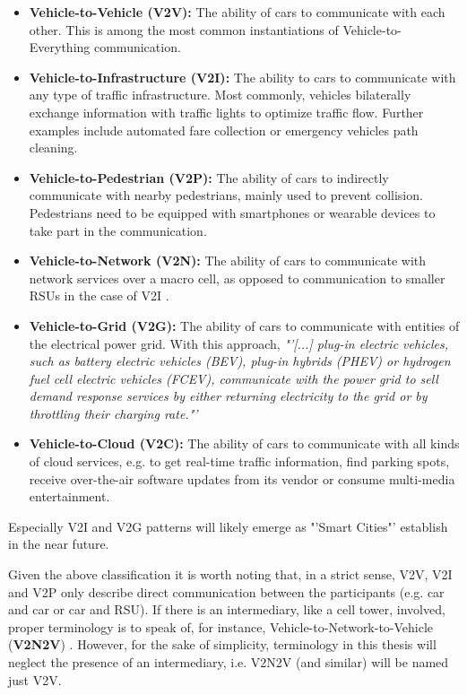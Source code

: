 \begin{itemize}
	\item \textbf{Vehicle-to-Vehicle (V2V):} The ability of cars to communicate with each other. This is among the most common instantiations of Vehicle-to-Everything communication. 
	\item  \textbf{Vehicle-to-Infrastructure (V2I):} The ability to cars to communicate with any type of traffic infrastructure. Most commonly, vehicles bilaterally exchange information with traffic lights to optimize traffic flow. Further examples include automated fare collection or emergency vehicles path cleaning.
	\item \textbf{Vehicle-to-Pedestrian (V2P):} The ability of cars to indirectly communicate with nearby pedestrians, mainly used to prevent collision. Pedestrians need to be equipped with smartphones or wearable devices to take part in the communication.
	\item \textbf{Vehicle-to-Network (V2N):} The ability of cars to communicate with network services over a macro cell, as opposed to communication to smaller RSUs in the case of V2I \cite{Abou-zeid19}. 
	\item \textbf{Vehicle-to-Grid (V2G):} The ability of cars to communicate with entities of the electrical power grid. With this approach, \textit{"'[...] plug-in electric vehicles, such as battery electric vehicles (BEV), plug-in hybrids (PHEV) or hydrogen fuel cell electric vehicles (FCEV), communicate with the power grid to sell demand response services by either returning electricity to the grid or by throttling their charging rate."'} \cite{wiki:v2g}
	\item \textbf{Vehicle-to-Cloud (V2C):} The ability of cars to communicate with all kinds of cloud services, e.g. to get real-time traffic information, find parking spots, receive over-the-air software updates from its vendor or consume multi-media entertainment.
\end{itemize}

Especially V2I and V2G patterns will likely emerge as "'Smart Cities"' establish in the near future.
\par
\bigskip

Given the above classification it is worth noting that, in a strict sense, V2V, V2I and V2P only describe direct communication between the participants (e.g. car and car or car and RSU). If there is an intermediary, like a cell tower, involved, proper terminology is to speak of, for instance, Vehicle-to-Network-to-Vehicle (\textbf{V2N2V}) \cite{5GAutomotiveAssociation2019}. However, for the sake of simplicity, terminology in this thesis will neglect the presence of an intermediary, i.e. V2N2V (and similar) will be named just V2V. 
\par
\bigskip

